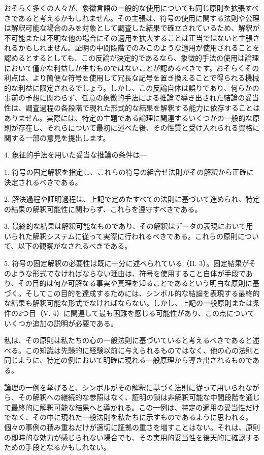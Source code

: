 \documentclass[a4paper,11pt,openany]{ltjsbook}
\begin{document}
おそらく多くの人々が、象徴言語の一般的な使用についても同じ原則を拡張すべきであると考えるかもしれません。その主張は、符号の使用に関する法則や公理は解釈可能な場合のみを対象として調査した結果で確立されているため、解釈が不可能または不明な他の場合にその適用を拡大することは正当ではないと主張されるかもしれません。証明の中間段階でのみこのような適用が使用されることを認めるとするとしても、この反論が決定的であるなら、象徴的手法の使用は論理において僅かな利益しか生むものではないことが認めるべきです。おそらくその利点は、より簡便な符号を使用して冗長な記号を置き換えることで得られる機械的な利益に限定されるでしょう。しかし、この反論自体は誤りであり、何らかの事前の予想に関わらず、任意の象徴的手法による推論で導き出された結論の妥当性は、調査過程の各段階で現れた形式的な結果を解釈する能力に依存することはありません。実際には、特定の主題である論理に関連するいくつかの一般的な原則が存在し、それらについて最初に述べた後、その性質と受け入れられる資格に関する一部の意見を提出します。

4. 象征的手法を用いた妥当な推論の条件は---

1. 符号の固定解釈を指定し、これらの符号の組合せ法則がその解釈から正確に決定されるべきである。

2. 解決過程や証明過程は、上記で定めたすべての法則に基づいて進められ、特定の結果の解釈可能性に関わらず、これらを遵守すべきである。

3. 最終的な結果は解釈可能なものであり、その解釈はデータの表現において用いられた解釈システムに従って実際に行われるべきである。これらの原則について、以下の観察がなされるべきである。

5. 符号の固定解釈の必要性は既に十分に述べられている（II. 3）。固定結果がそのような形式でなければならない理由は、符号を使用すること自体が手段であり、その目的は何か可解なる事実や真理を知ることであるという明白な原則に基づく。そしてこの目的を達成するためには、シンボル的な結論を表現する最終的な結果も解釈可能な形式でなければならない。しかし、上記の一般原則または条件の2つ目（V. 4）に関連して最も困難を感じる可能性があり、この点についていくつか追加の説明が必要である。

私は、その原則は私たちの心の一般法則に基づいていると考えるべきであると述べる。この知識は先験的に経験以前に与えられるものではなく、他の心の法則と同じように、特定の例において明確に現れる一般原理から導き出されるものである。

論理の一例を挙げると、シンボルがその解釈に基づく法則に従って用いられながら、その解釈への継続的な参照はなく、証明の鎖は非解釈可能な中間段階を通じて最終的に解釈可能な結果へと導かれる。この一例は、特定の適用の妥当性だけでなく、その中に現れた一般法則を私たちに示すものであるように思われる。個々の事例の積み重ねだけが適切に証拠の重さを増すことはない。それは、原則の即時的な効力が感じられない場合でも、その実用的妥当性を後天的に確認するための手段となるかもしれない。
\end{document}
